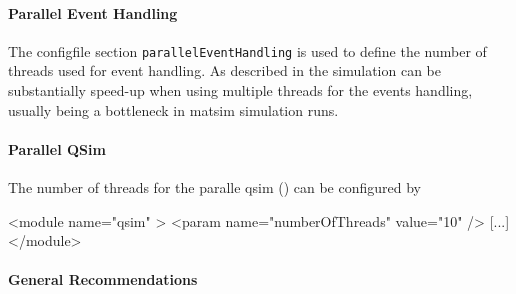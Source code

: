 \paragraph{Parallel Event Handling}
\label{sec:using-paralleleventhandling}

The \gls{configfile} section \lstinline|parallelEventHandling| is used to define the number of threads used for event handling. 
As described in \citet[][]{WaraichEtAl_TechRep_IVT_2009, WaraichEtAl_STRC_2009} the simulation can be substantially speed-up when using multiple threads for the events handling, usually being a bottleneck in \gls{matsim} simulation runs.


\paragraph{Parallel QSim}

The number of threads for the paralle \gls{qsim} (\cf \cite{Dobler_PhDThesis_2013}) can be configured by
\begin{xml}
<module name="qsim" >
    <param name="numberOfThreads" value="10" />
    [...]
</module>
\end{xml}


\paragraph{General Recommendations}

